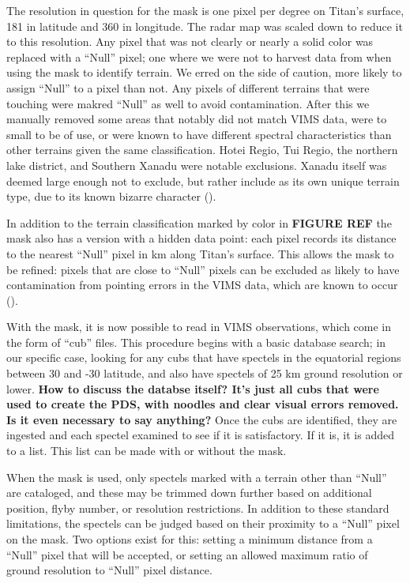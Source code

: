 \documentclass[twocolumn,linenumbers]{aastex631}
\begin{document}
The resolution in question for the mask is one pixel per degree on Titan's surface, 181 in latitude and 360 in longitude. The radar map was scaled down to reduce it to this resolution. Any pixel that was not clearly or nearly a solid color was replaced with a ``Null'' pixel; one where we were not to harvest data from when using the mask to identify terrain. We erred on the side of caution, more likely to assign ``Null'' to a pixel than not. Any pixels of different terrains that were touching were makred ``Null'' as well to avoid contamination. After this we manually removed some areas that notably did not match VIMS data, were to small to be of use, or were known to have different spectral characteristics than other terrains given the same classification. Hotei Regio, Tui Regio, the northern lake district, and Southern Xanadu were notable exclusions. Xanadu itself was deemed large enough not to exclude, but rather include as its own unique terrain type, due to its known bizarre character (). 

In addition to the terrain classification marked by color in \textbf{\color{blue}FIGURE REF\color{black}} the mask also has a version with a hidden data point: each pixel records its distance to the nearest ``Null'' pixel in km along Titan's surface. This allows the mask to be refined: pixels that are close to ``Null'' pixels can be excluded as likely to have contamination from pointing errors in the VIMS data, which are known to occur (). 

With the mask, it is now possible to read in VIMS observations, which come in the form of ``cub'' files. This procedure begins with a basic database search; in our specific case, looking for any cubs that have spectels in the equatorial regions between 30 and -30 latitude, and also have spectels of 25 km ground resolution or lower. \textbf{\color{red}How to discuss the databse itself? It's just all cubs that were used to create the PDS, with noodles and clear visual errors removed. Is it even necessary to say anything?\color{black}} Once the cubs are identified, they are ingested and each spectel examined to see if it is satisfactory. If it is, it is added to a list. This list can be made with or without the mask. 

When the mask is used, only spectels marked with a terrain other than ``Null'' are cataloged, and these may be trimmed down further based on additional position, flyby number, or resolution restrictions. In addition to these standard limitations, the spectels can be judged based on their proximity to a ``Null'' pixel on the mask. Two options exist for this: setting a minimum distance from a ``Null'' pixel that will be accepted, or setting an allowed maximum ratio of ground resolution to ``Null'' pixel distance.
\end{document}
